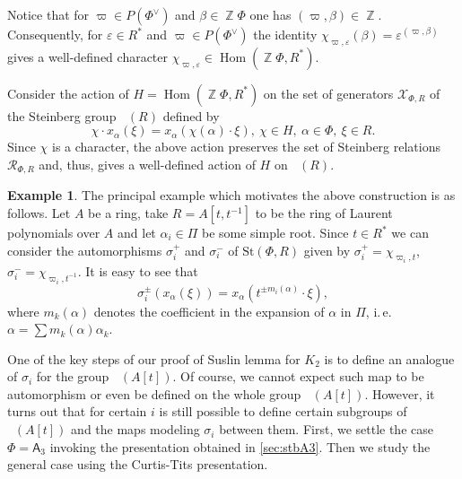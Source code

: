 \documentclass[oneside,12pt]{amsart}
\numberwithin{equation}{section}
\numberwithin{lem}{section}
\theoremstyle{definition}
\newtheorem{example}[lem]{Example}
\theoremstyle{remark}
\DeclareMathOperator{\St}{St^G}
\DeclareMathOperator{\Hom}{Hom}
\DeclareMathOperator{\ZZ}{{\mathbb Z}}
\newcommand{\Stb}{\mathrm{St}}
\newcommand{\rA}{\mathsf{A}}
\begin{document}
Notice that for $\varpi \in P(\Phi^\vee)$ and $\beta \in \ZZ \Phi$ one has $(\varpi, \beta) \in \ZZ$.
Consequently, for $\varepsilon \in R^*$ and $\varpi \in P(\Phi^\vee)$ the identity $\chi_{\varpi, \varepsilon}(\beta) = \varepsilon ^ {(\varpi, \beta)}$
gives a well-defined character $\chi_{\varpi, \varepsilon} \in \Hom(\ZZ \Phi, R^*)$.

Consider the action of $H=\Hom(\ZZ \Phi, R^*)$ on the set of generators $\mathcal{X}_{\Phi, R}$ of the Steinberg group $\St(R)$ defined by
\begin{equation} \chi \cdot x_\alpha(\xi) = x_\alpha(\chi(\alpha) \cdot \xi),\ \chi \in H,\ \alpha\in \Phi,\ \xi \in R. \end{equation}
Since $\chi$ is a character, the above action preserves the set of Steinberg relations $\mathcal{R}_{\Phi, R}$ and,
thus, gives a well-defined action of $H$ on $\St(R)$.

\begin{example} The principal example which motivates the above construction is as follows.
Let $A$ be a ring, take $R = A[t, t^{-1}]$ to be the ring of Laurent polynomials over $A$ and let $\alpha_i \in \Pi$ be some simple root.
Since $t \in R^*$ we can consider the automorphisms $\sigma_i^+$ and $\sigma_i^-$ of $\Stb(\Phi, R)$ given by $\sigma_i^+ = \chi_{\varpi_i, t}$, $\sigma_i^- = \chi_{\varpi_i, t^{-1}}$.
It is easy to see that 
\begin{equation}\sigma_i^\pm(x_\alpha(\xi)) = x_\alpha(t^{\pm m_i(\alpha)} \cdot \xi),\end{equation}
where $m_k(\alpha)$ denotes the coefficient in the expansion of $\alpha$ in $\Pi$, i.\,e. $\alpha = \sum m_k(\alpha) \alpha_k$.
\end{example}

One of the key steps of our proof of Suslin lemma for $K_2$ is to define an analogue of $\sigma_i$ for the group $\St(A[t])$.
Of course, we cannot expect such map to be automorphism or even be defined on the whole group $\St(A[t])$.
However, it turns out that for certain $i$ is still possible to define certain subgroups of $\St(A[t])$ and the maps modeling $\sigma_i$ between them.
First, we settle the case $\Phi=\rA_3$ invoking the presentation obtained in \ref{sec:stbA3}.
Then we study the general case using the Curtis-Tits presentation.
\end{document}
